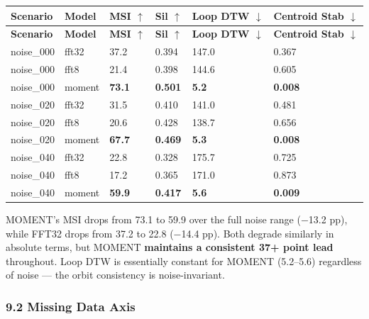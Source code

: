 \documentclass[11pt,a4paper]{article}
\begin{document}
\begin{longtable}{|l|l|l|l|l|l|}
\hline
\textbf{Scenario} & \textbf{Model} & \textbf{MSI $\uparrow$} & \textbf{Sil $\uparrow$} & \textbf{Loop DTW $\downarrow$} & \textbf{Centroid Stab $\downarrow$} \\
\hline
\endfirsthead
\hline
\textbf{Scenario} & \textbf{Model} & \textbf{MSI $\uparrow$} & \textbf{Sil $\uparrow$} & \textbf{Loop DTW $\downarrow$} & \textbf{Centroid Stab $\downarrow$} \\
\hline
\endhead
\hline
\endfoot
noise\_000 & fft32 & 37.2 & 0.394 & 147.0 & 0.367 \\
\hline
noise\_000 & fft8 & 21.4 & 0.398 & 144.6 & 0.605 \\
\hline
noise\_000 & moment & \textbf{73.1} & \textbf{0.501} & \textbf{5.2} & \textbf{0.008} \\
\hline
noise\_020 & fft32 & 31.5 & 0.410 & 141.0 & 0.481 \\
\hline
noise\_020 & fft8 & 20.6 & 0.428 & 138.7 & 0.656 \\
\hline
noise\_020 & moment & \textbf{67.7} & \textbf{0.469} & \textbf{5.3} & \textbf{0.008} \\
\hline
noise\_040 & fft32 & 22.8 & 0.328 & 175.7 & 0.725 \\
\hline
noise\_040 & fft8 & 17.2 & 0.365 & 171.0 & 0.873 \\
\hline
noise\_040 & moment & \textbf{59.9} & \textbf{0.417} & \textbf{5.6} & \textbf{0.009} \\
\hline
\end{longtable}

MOMENT's MSI drops from 73.1 to 59.9 over the full noise range ($-$13.2 pp), while FFT32
drops from 37.2 to 22.8 ($-$14.4 pp). Both degrade similarly in absolute terms, but MOMENT
\textbf{maintains a consistent 37+ point lead} throughout. Loop DTW is essentially constant for MOMENT
(5.2--5.6) regardless of noise --- the orbit consistency is noise-invariant.

\subsubsection{9.2 Missing Data Axis}
\end{document}
